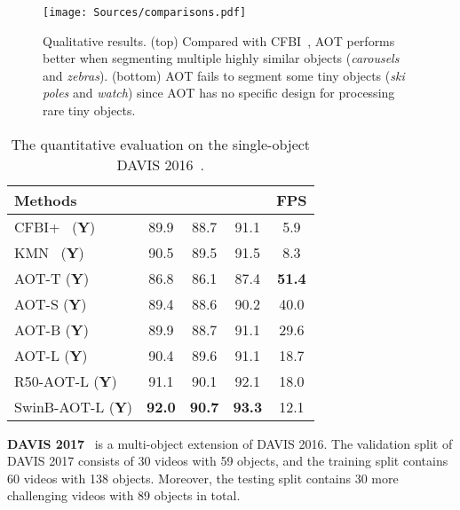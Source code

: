 \documentclass{article}
\newcommand{\zongxin}[1]{#1}
\begin{document}
\begin{figure}[t!]
    \centering
    \texttt{[image: Sources/comparisons.pdf]}

    \caption{\zongxin{Qualitative results. (top) Compared with CFBI~\cite{cfbi}, AOT performs better when segmenting multiple highly similar objects (\textit{carousels} and \textit{zebras}). (bottom) AOT fails to segment some tiny objects (\textit{ski poles} and \textit{watch}) since AOT has no specific design for processing rare tiny objects.}}
    \label{fig:comparisons}

\end{figure} 
\begin{wraptable}[13]{r}{0.45\textwidth}
\begin{center}
\vspace{-6.5mm}
\caption{The quantitative evaluation on the single-object DAVIS 2016~\cite{davis2016}.}\label{tab:davis2016}

\setlength{\tabcolsep}{2.5pt}
\begin{tabular}{l c c c c}
\toprule[1.5pt]
 Methods  &  &  &  & FPS \\
\midrule[1pt]
CFBI+~\cite{cfbip} (\textbf{Y})  & 89.9  & 88.7 & 91.1  & 5.9 \\
KMN~\cite{KMN} (\textbf{Y})  &  90.5 & {89.5}  & {91.5}  & 8.3 \\
\hline
AOT-T (\textbf{Y}) &  86.8  & 86.1 & 87.4 & \textbf{51.4} \\
AOT-S (\textbf{Y}) &  89.4  & 88.6 & 90.2 & 40.0 \\
AOT-B (\textbf{Y}) &  89.9  & 88.7 & 91.1 & 29.6 \\
AOT-L (\textbf{Y}) &  {90.4}  & {89.6} & {91.1} & 18.7 \\
R50-AOT-L (\textbf{Y}) &  {91.1}  & {90.1} & {92.1} & 18.0 \\
SwinB-AOT-L (\textbf{Y}) &  \textbf{92.0}  & \textbf{90.7} & \textbf{93.3} & 12.1 \\
\bottomrule[1.5pt]

\end{tabular}
\end{center}
\end{wraptable} \noindent \textbf{DAVIS 2017}~\cite{davis2017} is a multi-object extension of DAVIS 2016. The validation split of DAVIS 2017 consists of 30 videos with 59 objects, and the training split contains 60 videos with 138 objects. Moreover, the testing split contains 30 more challenging videos with 89 objects in total.
\end{document}

